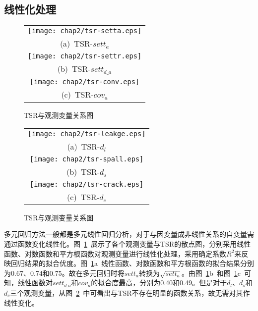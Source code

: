 \subsection{线性化处理}

\begin{figure}[htbp!] 
    \centering 
    \begin{tabular}{c} 
        \texttt{[image: chap2/tsr-setta.eps]} \\ 
        (a)~TSR-${sett}_{a}$ \\
        \texttt{[image: chap2/tsr-settr.eps]} \\ 
        (b)~TSR-$set{{t}_{d\_a}}$ \\
        \texttt{[image: chap2/tsr-conv.eps]} \\ 
        (c)~TSR-${cov}_{a}$ \\
    \end{tabular}
    \caption{TSR与观测变量关系图} 
    \label{fig:TSR与观测变量关系图} 
\end{figure}

\begin{figure}[htbp!] 
    \centering 
    \begin{tabular}{c} 
        \texttt{[image: chap2/tsr-leakge.eps]} \\ 
        (a)~TSR-${d}_{l}$ \\
        \texttt{[image: chap2/tsr-spall.eps]} \\ 
        (b)~TSR-$d_s$ \\
        \texttt{[image: chap2/tsr-crack.eps]} \\ 
        (c)~TSR-$d_c$ \\
    \end{tabular}
    \caption{TSR与观测变量关系图} 
    \label{fig:TSR与观测变量关系图2} 
\end{figure}

多元回归方法一般都是多元线性回归分析，对于与因变量成非线性关系的自变量需通过函数变化线性化。图~\ref{fig:TSR与观测变量关系图}~展示了各个观测变量与TSR的散点图，分别采用线性函数、对数函数和平方根函数对观测变量进行线性化处理，采用确定系数$R^2$来反映回归结果的拟合优度。图~\ref{fig:TSR与观测变量关系图}a~线性函数、对数函数和平方根函数的拟合结果分别为0.67、0.74和0.75。故在多元回归时将${sett}_{a}$转换为$\sqrt{sett_a}$。由图~\ref{fig:TSR与观测变量关系图}b~和图~\ref{fig:TSR与观测变量关系图}c~可知，线性函数对$set{{t}_{d\_a}}$和${cov}_{a}$的拟合度最高，分别为0.40和0.49。但是对于${d}_{l}$、$d_s$和$d_c$三个观测变量，从图~\ref{fig:TSR与观测变量关系图2}~中可看出与TSR不存在明显的函数关系，故无需对其作线性变化。

